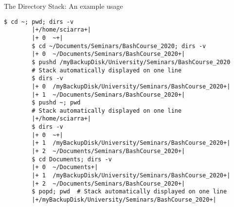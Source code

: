 \begin{frame}[fragile]{The Directory Stack: An example usage}
    \vspace{-3mm}
    \begin{lstlisting}[style=MyBash]
        $ cd ~; pwd; dirs -v
        |+/home/sciarra+|
        |+ 0  ~+|
        $ cd ~/Documents/Seminars/BashCourse_2020; dirs -v
        |+ 0  ~/Documents/Seminars/BashCourse_2020+|
        $ pushd /myBackupDisk/University/Seminars/BashCourse_2020
        # Stack automatically displayed on one line
        $ dirs -v
        |+ 0  /myBackupDisk/University/Seminars/BashCourse_2020+|
        |+ 1  ~/Documents/Seminars/BashCourse_2020+|
        $ pushd ~; pwd
        # Stack automatically displayed on one line
        |+/home/sciarra+|
        $ dirs -v
        |+ 0  ~+|
        |+ 1  /myBackupDisk/University/Seminars/BashCourse_2020+|
        |+ 2  ~/Documents/Seminars/BashCourse_2020+|
        $ cd Documents; dirs -v
        |+ 0  ~/Documents+|
        |+ 1  /myBackupDisk/University/Seminars/BashCourse_2020+|
        |+ 2  ~/Documents/Seminars/BashCourse_2020+|
        $ popd; pwd  # Stack automatically displayed on one line
        |+/myBackupDisk/University/Seminars/BashCourse_2020+|
    \end{lstlisting}
\end{frame}
